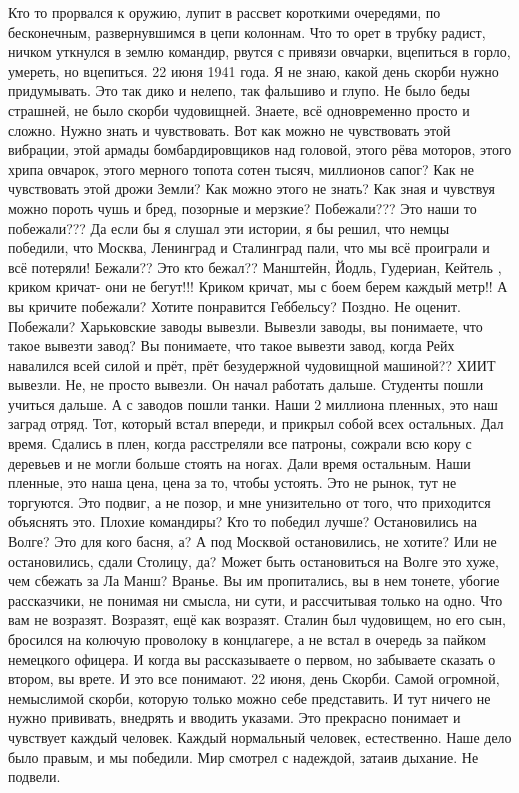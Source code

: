 Кто то прорвался к оружию, лупит в рассвет короткими очередями, по бесконечным, развернувшимся в цепи колоннам.
Что то орет в трубку радист, ничком уткнулся в землю командир, рвутся с привязи овчарки, вцепиться в горло, умереть, но вцепиться.
22 июня 1941 года.
Я не знаю, какой день скорби нужно придумывать.
Это так дико и нелепо, так фальшиво и глупо.
Не было беды страшней, не было скорби чудовищней.
Знаете, всё одновременно просто и сложно.
Нужно знать и чувствовать.
Вот как можно не чувствовать этой вибрации, этой армады бомбардировщиков над головой, этого рёва моторов, этого хрипа овчарок, этого мерного топота сотен тысяч, миллионов сапог?
Как не чувствовать этой дрожи Земли?
Как можно этого не знать?
Как зная и чувствуя можно пороть чушь и бред, позорные и мерзкие?
Побежали???
Это наши то побежали???
Да если бы я слушал эти истории, я бы решил, что немцы победили, что Москва, Ленинград и Сталинград пали, что мы всё проиграли и всё потеряли!
Бежали??
Это кто бежал??
Манштейн, Йодль, Гудериан, Кейтель , криком кричат- они не бегут!!!
Криком кричат, мы с боем берем каждый метр!!
А вы кричите побежали?
Хотите понравится Геббельсу?
Поздно.
Не оценит.
Побежали?
Харьковские заводы вывезли.
Вывезли заводы, вы понимаете, что такое вывезти завод?
Вы понимаете, что такое вывезти завод, когда Рейх навалился всей силой и прёт, прёт безудержной чудовищной машиной??
ХИИТ вывезли.
Не, не просто вывезли.
Он начал работать дальше.
Студенты пошли учиться дальше.
А с заводов пошли танки.
Наши 2 миллиона пленных, это наш заград отряд.
Тот, который встал впереди, и прикрыл собой всех остальных.
Дал время.
Сдались в плен, когда расстреляли все патроны, сожрали всю кору с деревьев и не могли больше стоять на ногах.
Дали время остальным.
Наши пленные, это наша цена, цена за то, чтобы устоять.
Это не рынок, тут не торгуются.
Это подвиг, а не позор, и мне унизительно от того, что приходится объяснять это.
Плохие командиры?
Кто то победил лучше?
Остановились на Волге?
Это для кого басня, а?
А под Москвой остановились, не хотите?
Или не остановились, сдали Столицу, да?
Может быть остановиться на Волге это хуже, чем сбежать за Ла Манш?
Вранье.
Вы им пропитались, вы в нем тонете, убогие рассказчики, не понимая ни смысла, ни сути, и рассчитывая только на одно.
Что вам не возразят.
Возразят, ещё как возразят.
Сталин был чудовищем, но его сын, бросился на колючую проволоку в концлагере, а не встал в очередь за пайком немецкого офицера.
И когда вы рассказываете о первом, но забываете сказать о втором, вы врете.
И это все понимают.
22 июня, день Скорби.
Самой огромной, немыслимой скорби, которую только можно себе представить.
И тут ничего не нужно прививать, внедрять и вводить указами.
Это прекрасно понимает и чувствует каждый человек.
Каждый нормальный человек, естественно.
Наше дело было правым, и мы победили.
Мир смотрел с надеждой, затаив дыхание.
Не подвели.

